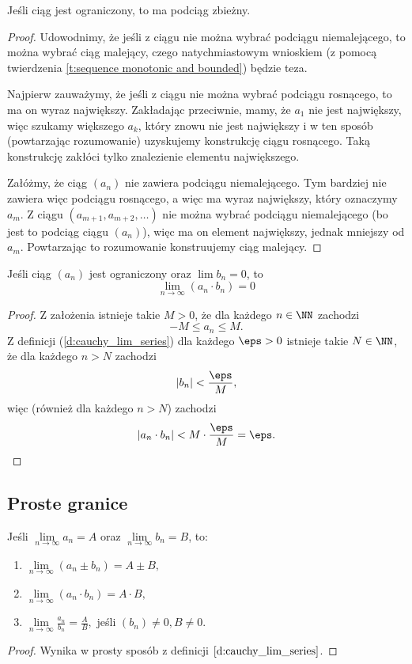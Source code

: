 \begin{theorem}
    Jeśli ciąg jest ograniczony, to ma podciąg zbieżny.
\end{theorem}
\begin{proof}
    Udowodnimy, że jeśli z ciągu nie można wybrać podciągu niemalejącego, to można wybrać ciąg malejący, czego natychmiastowym wnioskiem (z pomocą twierdzenia \ref{t:sequence monotonic and bounded}) będzie teza.

    Najpierw zauważymy, że jeśli z ciągu nie można wybrać podciągu rosnącego, to ma on wyraz największy. Zakładając przeciwnie, mamy, że $a_1$ nie jest największy, więc szukamy większego $a_k$, który znowu nie jest największy i w ten sposób (powtarzając rozumowanie) uzyskujemy konstrukcję ciągu rosnącego. Taką konstrukcję zakłóci tylko znalezienie elementu największego.

    Załóżmy, że ciąg $(a_n)$ nie zawiera podciągu niemalejącego. Tym bardziej nie zawiera więc podciągu rosnącego, a więc ma wyraz największy, który oznaczymy $a_m$. Z ciągu $(a_{m+1}, a_{m+2}, \ldots)$ nie można wybrać podciągu niemalejącego (bo jest to podciąg ciągu $(a_n)$), więc ma on element największy, jednak mniejszy od $a_m$. Powtarzając to rozumowanie konstruujemy ciąg malejący.
\end{proof}

\begin{theorem}
    \label{t:sequence bounded and convergent to 0}
    Jeśli ciąg $(a_n)$ jest ograniczony oraz $\lim b_n = 0$, to
    \[ \lim_{n \to \infty} (a_n \cdot b_n) = 0 \]
\end{theorem}
\begin{proof}
    Z założenia istnieje takie $M > 0$, że dla każdego $n \in \NN$ zachodzi
    \[ -M \leq a_n \leq M. \]
    Z definicji (\ref{d:cauchy_lim_series}) dla każdego $\eps > 0$ istnieje takie $N \in \NN$, że dla każdego $n > N$ zachodzi
    \[ |b_n| < \frac{\eps}{M}, \]
    więc (również dla każdego $n > N$) zachodzi
    \[ |a_n \cdot b_n| < M \cdot \frac{\eps}{M} = \eps. \]
\end{proof}

\subsection{Proste granice}
\begin{theorem}
    Jeśli $\lim\limits_{n \to \infty} a_n = A$ oraz $\lim\limits_{n \to \infty} b_n = B$, to:
    \begin{enumerate}
        \item $\lim\limits_{n \to \infty} (a_n \pm b_n) = A \pm B,$
        \item $\lim\limits_{n \to \infty} (a_n \cdot b_n) = A \cdot B,$
        \item $\lim\limits_{n \to \infty} \frac{a_n}{b_n} = \frac{A}{B},$ jeśli $(b_n) \neq 0, B \neq 0$.
    \end{enumerate}
\end{theorem}
\begin{proof}
    Wynika w prosty sposób z definicji $\ref{d:cauchy_lim_series}$.
\end{proof}

